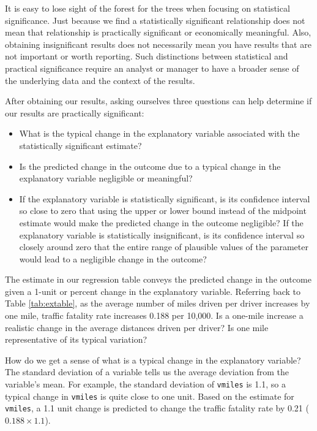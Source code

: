 \documentclass[
]{book}
\providecommand{\tightlist}{%
  \setlength{\itemsep}{0pt}\setlength{\parskip}{0pt}}
\begin{document}
It is easy to lose sight of the forest for the trees when focusing on statistical significance. Just because we find a statistically significant relationship does not mean that relationship is practically significant or economically meaningful. Also, obtaining insignificant results does not necessarily mean you have results that are not important or worth reporting. Such distinctions between statistical and practical significance require an analyst or manager to have a broader sense of the underlying data and the context of the results.

After obtaining our results, asking ourselves three questions can help determine if our results are practically significant:

\begin{itemize}
\tightlist
\item
  What is the typical change in the explanatory variable associated with the statistically significant estimate?
\item
  Is the predicted change in the outcome due to a typical change in the explanatory variable negligible or meaningful?
\item
  If the explanatory variable is statistically significant, is its confidence interval so close to zero that using the upper or lower bound instead of the midpoint estimate would make the predicted change in the outcome negligible? If the explanatory variable is statistically insignificant, is its confidence interval so closely around zero that the entire range of plausible values of the parameter would lead to a negligible change in the outcome?
\end{itemize}

The estimate in our regression table conveys the predicted change in the outcome given a 1-unit or percent change in the explanatory variable. Referring back to Table \ref{tab:extable}, as the average number of miles driven per driver increases by one mile, traffic fatality rate increases 0.188 per 10,000. Is a one-mile increase a realistic change in the average distances driven per driver? Is one mile representative of its typical variation?

How do we get a sense of what is a typical change in the explanatory variable? The standard deviation of a variable tells us the average deviation from the variable's mean. For example, the standard deviation of \texttt{vmiles} is 1.1, so a typical change in \texttt{vmiles} is quite close to one unit. Based on the estimate for \texttt{vmiles}, a 1.1 unit change is predicted to change the traffic fatality rate by 0.21 (\(0.188 \times 1.1\)).
\end{document}

